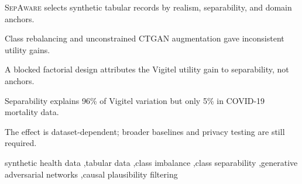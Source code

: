 \documentclass[review,12pt]{elsarticle}
\newcommand{\sepa}{\textsc{SepAware}}
\begin{document}
\begin{frontmatter}
\begin{highlights}
\item \sepa{} selects synthetic tabular records by realism, separability, and domain anchors.
\item Class rebalancing and unconstrained CTGAN augmentation gave inconsistent utility gains.
\item A blocked factorial design attributes the Vigitel utility gain to separability, not anchors.
\item Separability explains 96\% of Vigitel variation but only 5\% in COVID-19 mortality data.
\item The effect is dataset-dependent; broader baselines and privacy testing are still required.
\end{highlights}

\begin{keyword}
synthetic health data \sep tabular data \sep class imbalance \sep class separability \sep generative adversarial networks \sep causal plausibility filtering
\end{keyword}

\end{frontmatter}













\appendix

\end{document}
